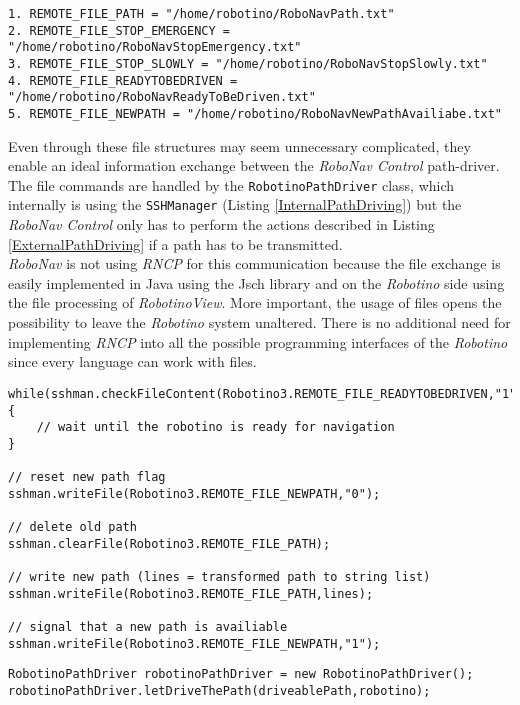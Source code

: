 \newpage
\begin{lstlisting}[caption = Communication Files and their paths on the Robotino, label = filesPathDriving]
1. REMOTE_FILE_PATH = "/home/robotino/RoboNavPath.txt"
2. REMOTE_FILE_STOP_EMERGENCY = "/home/robotino/RoboNavStopEmergency.txt"
3. REMOTE_FILE_STOP_SLOWLY = "/home/robotino/RoboNavStopSlowly.txt"
4. REMOTE_FILE_READYTOBEDRIVEN = "/home/robotino/RoboNavReadyToBeDriven.txt"
5. REMOTE_FILE_NEWPATH = "/home/robotino/RoboNavNewPathAvailiabe.txt"
\end{lstlisting} 
Even through these file structures may seem unnecessary complicated, they enable an ideal information exchange between the \textit{RoboNav Control} path-driver. The file commands are handled by the \texttt{RobotinoPathDriver} class, which internally is using the \texttt{SSHManager} (Listing \ref{InternalPathDriving}) but the \textit{RoboNav Control} only has to perform the actions described in Listing \ref{ExternalPathDriving} if a path has to be transmitted. \\
\textit{RoboNav} is not using \textit{RNCP} for this communication because the file exchange is easily implemented in Java using the Jsch library and on the \textit{Robotino} side using the file processing of \textit{RobotinoView}. More important, the usage of files opens the possibility to leave the \textit{Robotino} system unaltered. There is no additional need for implementing \textit{RNCP} into all the possible programming interfaces of the \textit{Robotino} since every language can work with files.
\begin{lstlisting}[caption = Internal handling of the path driving using the SSHManager (section \ref{subsec:communicationRobotino}), label = InternalPathDriving]
while(sshman.checkFileContent(Robotino3.REMOTE_FILE_READYTOBEDRIVEN,"1")){ 
    // wait until the robotino is ready for navigation
}

// reset new path flag
sshman.writeFile(Robotino3.REMOTE_FILE_NEWPATH,"0");

// delete old path
sshman.clearFile(Robotino3.REMOTE_FILE_PATH);

// write new path (lines = transformed path to string list)
sshman.writeFile(Robotino3.REMOTE_FILE_PATH,lines);

// signal that a new path is availiable
sshman.writeFile(Robotino3.REMOTE_FILE_NEWPATH,"1");
\end{lstlisting}
\begin{lstlisting}[caption = Actions that need to be performed to trigger the path-driving functionality, label = ExternalPathDriving]
RobotinoPathDriver robotinoPathDriver = new RobotinoPathDriver();
robotinoPathDriver.letDriveThePath(driveablePath,robotino);
\end{lstlisting}


